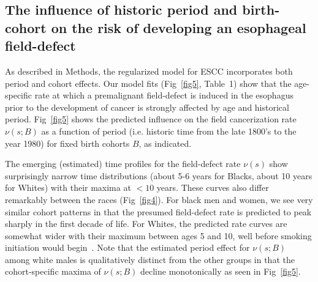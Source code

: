 \documentclass[10pt,letterpaper]{article}
\begin{document}
\subsection*{The influence of historic period and birth-cohort on the risk of developing an esophageal field-defect}
As described in Methods, the regularized model for ESCC incorporates both period and cohort effects. Our model fits (Fig~\ref{fig5}, Table~1) show that the age-specific rate at which a premalignant field-defect is induced in the esophagus prior to the development of cancer is strongly affected by age and historical period. Fig~\ref{fig5} shows the predicted influence on the field cancerization rate $\nu(s; B)$ as a function of period (i.e. historic time from the late 1800's to the year 1980) for fixed birth cohorts $B$, as indicated.  

The emerging (estimated) time profiles for the field-defect rate $\nu(s)$ show surprisingly narrow time distributions (about 5-6 years for Blacks, about 10 years for Whites) with their maxima at $<10$ years. These curves also differ remarkably between the races (Fig~\ref{fig4}). For black men and women, we see very similar cohort patterns in that the presumed field-defect rate is predicted to peak sharply in the first decade of life. For Whites, the predicted rate curves are somewhat wider with their maximum between ages 5 and 10, well before smoking initiation would begin~\cite{Holford2016}.  Note that the estimated period effect for $\nu(s; B)$ among white males is qualitatively distinct from the other groups in that the cohort-specific maxima of $\nu(s; B)$ decline monotonically as seen in Fig~\ref{fig5}.
\medskip
\end{document}
